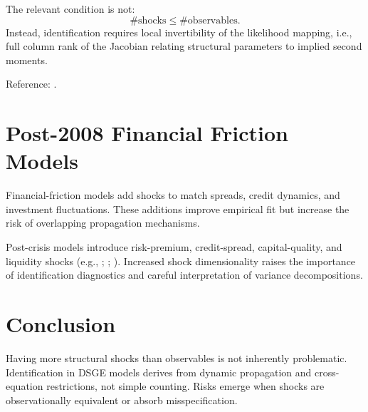 \documentclass[11pt]{article}
\begin{document}
\begin{technicalbox}
The relevant condition is not:
\begin{equation}
\#\text{shocks} \le \#\text{observables}.
\end{equation}
Instead, identification requires local invertibility of the likelihood mapping,
i.e., full column rank of the Jacobian relating structural parameters to
implied second moments.
\end{technicalbox}

Reference: \citet{iskrev2010}.

\section{Post-2008 Financial Friction Models}

\begin{intuitionbox}
Financial-friction models add shocks to match spreads, credit dynamics,
and investment fluctuations. These additions improve empirical fit but increase
the risk of overlapping propagation mechanisms.
\end{intuitionbox}

\begin{technicalbox}
Post-crisis models introduce risk-premium, credit-spread, capital-quality,
and liquidity shocks (e.g., \citealt{christiano2014}; \citealt{gerali2010};
\citealt{gertlerkaradi2011}). Increased shock dimensionality raises the
importance of identification diagnostics and careful interpretation of
variance decompositions.
\end{technicalbox}

\section*{Conclusion}

Having more structural shocks than observables is not inherently problematic.
Identification in DSGE models derives from dynamic propagation and
cross-equation restrictions, not simple counting.
Risks emerge when shocks are observationally equivalent or absorb misspecification.
\end{document}
